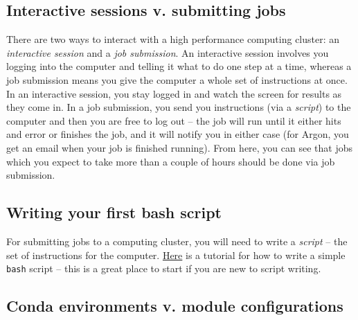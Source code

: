 \documentclass[
]{book}
\begin{document}
\hypertarget{interactive-sessions-v.-submitting-jobs}{%
\subsection{Interactive sessions v. submitting jobs}\label{interactive-sessions-v.-submitting-jobs}}

There are two ways to interact with a high performance computing cluster: an \emph{interactive session} and a \emph{job submission}. An interactive session involves you logging into the computer and telling it what to do one step at a time, whereas a job submission means you give the computer a whole set of instructions at once. In an interactive session, you stay logged in and watch the screen for results as they come in. In a job submission, you send you instructions (via a \emph{script}) to the computer and then you are free to log out -- the job will run until it either hits and error or finishes the job, and it will notify you in either case (for Argon, you get an email when your job is finished running). From here, you can see that jobs which you expect to take more than a couple of hours should be done via job submission.

\hypertarget{writing-your-first-bash-script}{%
\subsection{Writing your first bash script}\label{writing-your-first-bash-script}}

For submitting jobs to a computing cluster, you will need to write a \emph{script} -- the set of instructions for the computer. \href{https://www.linuxfoundation.org/blog/blog/classic-sysadmin-writing-a-simple-bash-script}{Here} is a tutorial for how to write a simple \texttt{bash} script -- this is a great place to start if you are new to script writing.

\hypertarget{conda-environments-v.-module-configurations}{%
\subsection{Conda environments v. module configurations}\label{conda-environments-v.-module-configurations}}
\end{document}
